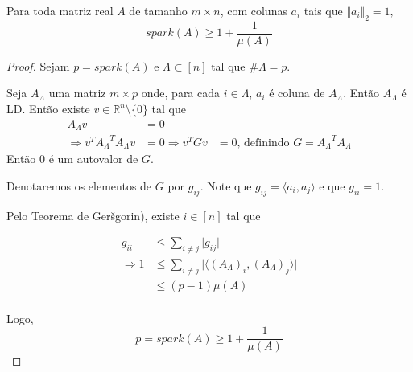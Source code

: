 \begin{lema}
Para toda matriz real $A$ de tamanho $m \times n$, com colunas $a_i$ tais que $\Vert a_i \Vert_2 = 1,$
$$spark(A) \geq 1 + \frac{1}{\mu(A)}$$
\label{lem:spark}
\end{lema}
\begin{proof}
Sejam $p = spark(A)$ e $\Lambda \subset [n]$ tal que $\# \Lambda = p$.

Seja $A_{\Lambda}$ uma matriz $m \times p$ onde, para cada $i \in \Lambda$, $a_i$ é coluna de $A_{\Lambda}$. Então $A_{\Lambda}$ é LD. Então existe $v \in \mathbb{R}^n \setminus \lbrace 0 \rbrace$ tal que
\begin{subequations}
\begin{align*}
A_{\Lambda} v & = 0 \\
\Rightarrow v^T {A_{\Lambda}}^T A_{\Lambda} v & = 0
\Rightarrow v^T G v & = 0  \text{, definindo } G = {A_{\Lambda}}^T A_{\Lambda}
\end{align*}
\end{subequations}
Então $0$ é um autovalor de $G$.

Denotaremos os elementos de $G$ por $g_{ij}$. Note que $g_{ij} = \langle a_i, a_j \rangle$ e que $g_{ii} = 1$.

Pelo Teorema de Ger\v{s}gorin), existe $i \in [n]$ tal que

\begin{subequations}
\begin{align*}
g_{ii} & \leq \sum_{i \neq j} \vert g_{ij} \vert \\
\Rightarrow 1 &\leq \sum_{i \neq j} \vert \langle (A_{\Lambda})_i, (A_{\Lambda})_j \rangle \vert \\
& \leq (p - 1) \mu(A) \\
\end{align*}
\end{subequations}

Logo,
$$ p = spark(A) \geq 1 + \frac{1}{\mu(A)}$$
\end{proof}



